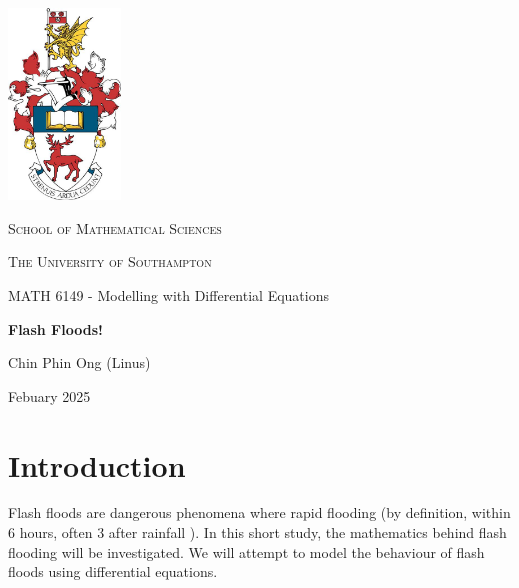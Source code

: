 \documentclass[12pt]{article}
\begin{document}


\begin{titlepage}
    \centering
    \includegraphics[width=3cm]{crest.jpg}\par
    \vspace{0.3cm}
    {\scshape\Large School of Mathematical Sciences \par}
    \vspace{0.25cm}
    {\scshape\Large The University of Southampton \par}
    \vspace{0.25cm}
    {\Large MATH 6149 - Modelling with Differential Equations \par}
    \vspace{0.5cm}
    {\huge\bfseries Flash Floods!\par}
    \vspace{0.5cm}

    {\Large Chin Phin Ong (Linus) \par}

    {\large  \par}
    \vfill
    {\large Febuary 2025 \par}
\end{titlepage}

\begin{abstract}
    
\end{abstract}

\section{Introduction}
Flash floods are dangerous phenomena where rapid flooding (by definition, within 6 hours, often 3 after rainfall \cite{national-oceanic-and-atmospheric-administration-no-date}). In this short study, the mathematics behind flash flooding will be investigated. We will attempt to model the behaviour of flash floods using differential equations.
\end{document}
